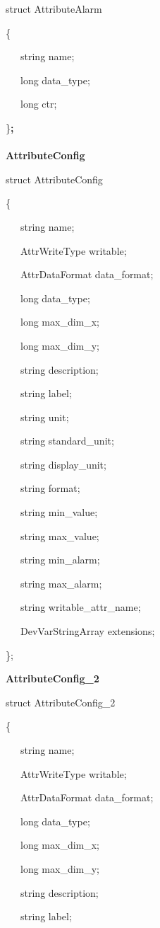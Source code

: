 struct AttributeAlarm

\{

~~~string name;

~~~long data\_type;

~~~long ctr;

\}\textbf{;}\\
\textbf{}\\
\textbf{AttributeConfig}

struct AttributeConfig

\{

~~~string name;

~~~AttrWriteType writable;

~~~AttrDataFormat data\_format;

~~~long data\_type;

~~~long max\_dim\_x;

~~~long max\_dim\_y;

~~~string description;

~~~string label;

~~~string unit;

~~~string standard\_unit;

~~~string display\_unit;

~~~string format;

~~~string min\_value;

~~~string max\_value;

~~~string min\_alarm;

~~~string max\_alarm;

~~~string writable\_attr\_name;

~~~DevVarStringArray extensions;

\};\\


\begin{flushleft}
\textbf{AttributeConfig\_2}
\par\end{flushleft}

struct AttributeConfig\_2

\{

~~~string name;

~~~AttrWriteType writable;

~~~AttrDataFormat data\_format;

~~~long data\_type;

~~~long max\_dim\_x;

~~~long max\_dim\_y;

~~~string description;

~~~string label;

